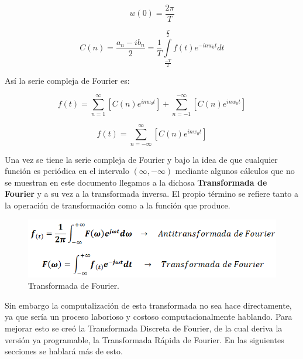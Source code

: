 \documentclass{report}
\begin{document}
\[
w\left( 0\right) =\frac{2\pi}{T}
\]

\[
C\left( n\right) = \frac{a_n - ib_n}{2} =\frac{1}{T}\int\limits_{\frac{-T}{2}}^{\frac{T}{2}} f\left( t\right) e^{-inw_0t} dt
\]

\noindent Así la serie compleja de Fourier es:

\[
f\left( t\right) =\sum\limits_{n=1}^\infty \left[
C\left( n\right) e^{inw_{0}t}\right] +\sum\limits_{n=-1}^{-\infty} \left[C\left( n\right) e^{inw_{0}t}\right] 
\]

\[
f\left( t\right) =\sum\limits_{n=-\infty}^\infty \left[
C\left( n\right) e^{inw_{0}t}\right] 
\]

Una vez se tiene la serie compleja de Fourier y bajo la idea de que cualquier función es periódica en el intervalo $(\infty, -\infty)$ mediante algunos cálculos que no se muestran en este documento llegamos a la dichosa \textbf{Transformada de Fourier} y a su vez a la transformada inversa. El propio término se refiere tanto a la operación de transformación como a la función que produce.\medskip

\begin{figure}[h!]
    \centering
    \includegraphics[scale=0.6]{Images/Fourier.png}
    \caption{Transformada de Fourier.}
    \label{Fourier}
\end{figure}

Sin embargo la computalización de esta transformada no sea hace directamente, ya que sería un proceso laborioso y costoso computacionalmente hablando. Para mejorar esto se creó la Transformada Discreta de Fourier, de la cual deriva la versión ya programable, la Transformada Rápida de Fourier. En las siguientes secciones se hablará más de esto.
\end{document}
